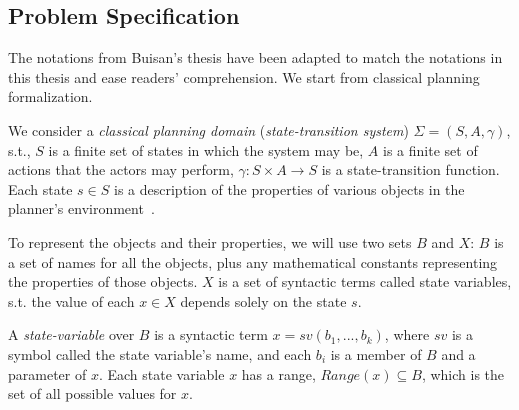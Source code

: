 \subsection{Problem Specification}

The notations from Buisan's thesis have been adapted to match the notations in this thesis and ease readers' comprehension. We start from classical planning formalization.

We consider a \textit{classical planning domain} (\textit{state-transition system}) $\Sigma = (S, A,\gamma)$, s.t., $S$ is a finite set of states in which the system may be, $A$ is a finite set of actions that the actors may perform, $\gamma: S \times A \rightarrow S$ is a state-transition function. Each state $s \in S$ is a description of the properties of various objects in the planner's environment~\cite{naubooks0014222}. 

To represent the objects and their properties, we will use two sets $B$ and $X$: $B$ is a set of names for all the objects, plus any mathematical constants representing the properties of those objects. $X$ is a set of syntactic terms called state variables, s.t. the value of each $x \in X$ depends solely on the state $s$.

A \textit{state-variable} over $B$ is a syntactic term $x = sv(b_1, ..., b_k)$, where $sv$ is a symbol called the state variable's name, and each $b_i$ is a member of $B$ and a parameter of $x$. Each state variable $x$ has a range, $\textit{Range}(x) \subseteq B$, which is the set of all possible values for $x$.


